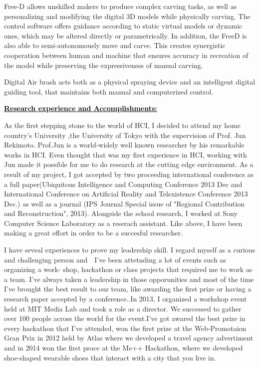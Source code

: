 \documentclass{article}
\newcommand{\statement}[1]{\par\medskip
  \underline{\textcolor{black}{\textbf{#1:}}}\space
}
\begin{document}
Free-D allows unskilled makers to produce complex carving tasks, as well as personalizing and modifying the digital 3D models while physically carving. The control software offers guidance according to static virtual models or dynamic ones, which may be altered directly or parametrically. In addition, the FreeD is also able to semi-autonomously move and carve. This creates synergistic cooperation between human and machine that ensures accuracy in recreation of the model while preserving the expressiveness of manual carving. 

Digital Air brash acts both as a physical spraying device and an intelligent digital guiding tool, that maintains both manual and computerized control.


\statement{Research experience and Accomplishments}
As the first stepping stone to the world of HCI, I decided to attend my home country's University ,the University of Tokyo with the supervision of Prof. Jun Rekimoto. Prof.Jun is a world-widely well known researcher by his remarkable works in HCI. Even thought that was my first experience in HCI, working with Jun made it possible for me to do research at the cutting edge environment. As a result of my project, I got accepted by two proceeding international conferencs as a full paper(Ubiquitous Intelligence and Computing Conference 2013 Dec and International Conference on Artificial Reality and Telexistence Conference 2013 Dec.) as well as a journal (IPS Journal Special issue of "Regional Contribution and Reconstruction", 2013). Alongside the school research, I worked at Sony Computer Science Laborarory as a reserach assistant. Like above, I have been making a great effort in order to be a succesful researcher. 

I have seveal experiences to prove my leadership skill. I regard myself as a curious and challenging person and　I’ve been attetnding a lot of events such as organizing a work- shop, hackathon or class projects that required me to work as a team. I’ve always taken a leadership in those opporunities and most of the time I’ve brought the best result to our team, like awarding the first prize or having a research paper accepted by a conference..In 2013, I organized a workshop event held at MIT Media Lab and took a role as a director. We successed to gather over 100 people across the world for the event.I've got awared the best prize in every hackathon that I've attended, won the first prize at the Web-Promotaion Gran Prix in 2012 held by Atlas where we developed a travel agency advertiment and in 2014 won the first proce at the Me++ Hackathon, where we developed shoe-shaped wearable shoes that interact with a city that you live in. 
\end{document}
